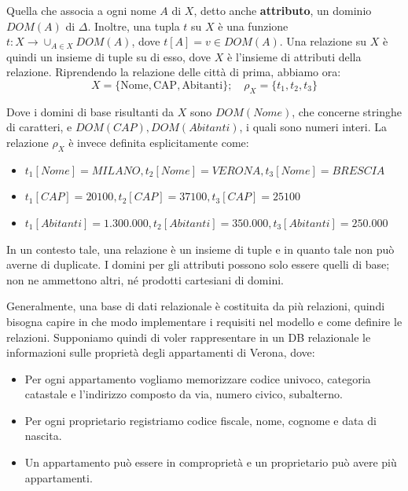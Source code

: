\noindent Quella che associa a ogni nome $A$ di $X$, detto anche \textbf{attributo}, un dominio $DOM(A)$ di $\Delta$. Inoltre, una tupla $t$ su $X$ è
una funzione $t:X \to \cup_{A\in X}DOM(A)$, dove $t[A] = v\in DOM(A)$. Una relazione su $X$ è quindi un insieme di tuple su di esso, dove $X$ è
l'insieme di attributi della relazione. Riprendendo la relazione delle città di prima, abbiamo ora: \[
    X = \{\text{Nome}, \text{CAP}, \text{Abitanti}\};\quad \rho_{X} = \{t_1, t_2, t_3\}
\]

\noindent Dove i domini di base risultanti da $X$ sono $DOM(Nome)$, che concerne stringhe di caratteri, e $DOM(CAP), DOM(Abitanti)$, i quali sono
numeri interi. La relazione $\rho_{X}$ è invece definita esplicitamente come: \begin{itemize}
    \item $t_1[Nome] = MILANO, t_2[Nome] = VERONA, t_3[Nome] = BRESCIA$
    \item $t_1[CAP] = 20100, t_2[CAP] = 37100, t_3[CAP] = 25100$
    \item $t_1[Abitanti] = 1.300.000, t_2[Abitanti] = 350.000, t_3[Abitanti] = 250.000$
\end{itemize}

\noindent In un contesto tale, una relazione è un insieme di tuple e in quanto tale non può averne di duplicate. I domini per gli attributi possono solo
essere quelli di base; non ne ammettono altri, né prodotti cartesiani di domini.\par
Generalmente, una base di dati relazionale è costituita da più relazioni, quindi bisogna capire in che modo implementare i requisiti nel modello e come
definire le relazioni. Supponiamo quindi di voler rappresentare in un DB relazionale le informazioni sulle proprietà degli appartamenti di Verona, dove:
\begin{itemize}
    \item Per ogni appartamento vogliamo memorizzare codice univoco, categoria catastale e l'indirizzo composto da via, numero civico, subalterno.
    \item Per ogni proprietario registriamo codice fiscale, nome, cognome e data di nascita.
    \item Un appartamento può essere in comproprietà e un proprietario può avere più appartamenti.
\end{itemize}

